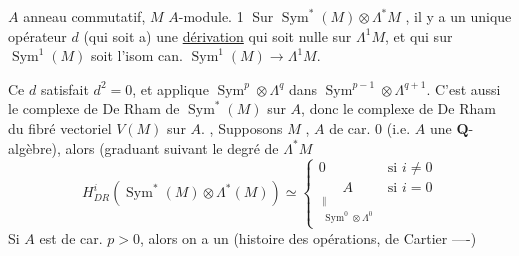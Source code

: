 
$A$ anneau commutatif, $M$ $A$-module.
\textcircled{1} Sur $\operatorname{Sym}^*(M)\otimes\Lambda^*M$ , il y a un unique opérateur $d$ (qui soit  a) une \uline{dérivation}    qui soit nulle sur $\Lambda^1M$, et qui sur $\operatorname{Sym}^1(M)$ soit l'isom can. $\operatorname{Sym}^1(M)\longrightarrow\Lambda^1M$.

Ce $d$  satisfait $d^2=0$, et applique $\operatorname{Sym}^p\otimes\Lambda^q$ dans $\operatorname{Sym}^{p-1}\otimes\Lambda^{q+1}$.   C'est aussi le complexe de De Rham de $\operatorname{Sym}^*(M)$ sur $A$, donc le complexe de De Rham du fibré vectoriel $V(M)$ sur $A$. ,
Supposons $M$ ,  $A$ de car. $0$ (i.e. $A$ une $\mathbf Q$-algèbre), alors
(graduant suivant le degré de $\Lambda^*M$
\[
H^i_{DR}(\operatorname{Sym}^*(M)\otimes\Lambda^*(M))\simeq
\begin{cases}0&\text{si }i\neq0\\
\underset{\substack{\Vert\\\operatorname{Sym}^0\otimes\Lambda^0}}{A}&\text{si }i=0
\end{cases}
\]
Si $A$ est de car. $p>0$,  alors on a un (histoire des opérations, de Cartier ----)

